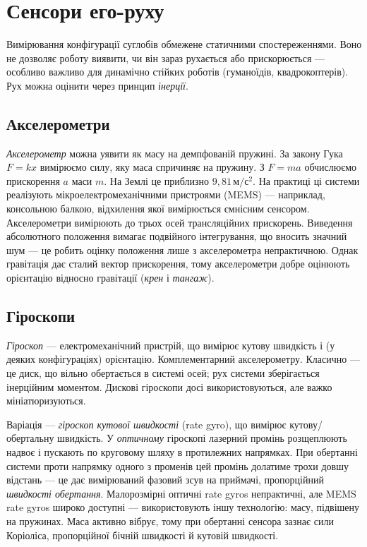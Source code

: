 \section{Сенсори его-руху}\label{sec:sensors:inertia}

Вимірювання конфігурації суглобів обмежене статичними спостереженнями. Воно не дозволяє роботу виявити, чи він зараз рухається або прискорюється — особливо важливо для динамічно стійких роботів (гуманоїдів, квадрокоптерів). Рух можна оцінити через принцип \emph{інерції}.

\subsection{Акселерометри}

\emph{Акселерометр} можна уявити як масу на демпфованій пружині. За закону Гука $F=kx$ вимірюємо силу, яку маса спричиняє на пружину. З $F=ma$ обчислюємо прискорення $a$ маси $m$. На Землі це приблизно $9{,}81\,\mathrm{м/с^2}$.
На практиці ці системи реалізують мікроелектромеханічними пристроями (MEMS) — наприклад, консольною балкою, відхилення якої вимірюється ємнісним сенсором. Акселерометри вимірюють до трьох осей трансляційних прискорень. Виведення абсолютного положення вимагає подвійного інтегрування, що вносить значний шум — це робить оцінку положення лише з акселерометра непрактичною.
Однак гравітація дає сталий вектор прискорення, тому акселерометри добре оцінюють орієнтацію відносно гравітації (\emph{крен} і \emph{тангаж}).

\subsection{Гіроскопи}\label{sec:gyroscopes}

\emph{Гіроскоп} — електромеханічний пристрій, що вимірює кутову швидкість і (у деяких конфігураціях) орієнтацію. Комплементарний акселерометру. Класично — це диск, що вільно обертається в системі осей; рух системи зберігається інерційним моментом. Дискові гіроскопи досі використовуються, але важко мініатюризуються.

Варіація — \emph{гіроскоп кутової швидкості} (rate gyro), що вимірює кутову/обертальну швидкість.
У \emph{оптичному} гіроскопі лазерний промінь розщеплюють надвоє і пускають по круговому шляху в протилежних напрямках. При обертанні системи проти напрямку одного з променів цей промінь долатиме трохи довшу відстань — це дає вимірюваний фазовий зсув на приймачі, пропорційний \emph{швидкості обертання}.
Малорозмірні оптичні rate gyros непрактичні, але MEMS rate gyros широко доступні — використовують іншу технологію: масу, підвішену на пружинах. Маса активно вібрує, тому при обертанні сенсора зазнає сили Коріоліса, пропорційної бічній швидкості й кутовій швидкості.

